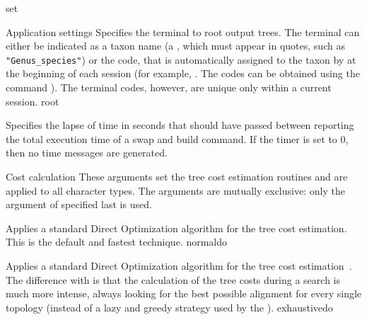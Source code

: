\begin{command}{set}{}
\begin{arguments}
\begin{argumentgroup}{Application settings}
                {Specifies the terminal to root output trees.
                 The terminal can either be indicated as a taxon name (a
                \poystring, which must appear in quotes, such as
                \texttt{"Genus\_species"}) or the code, that is automatically
                assigned to the taxon by \poy at the beginning of each \poy
                session (for example, . The codes can
                be obtained using the command ).  The
                terminal codes, however, are unique only within a current
                session.}
                {root}

                {Specifies the lapse of time in seconds that should have passed
                between reporting the total execution time of a swap and build
                command. If the timer is set to 0, then no time messages are
                generated.}{}

        \end{argumentgroup}

        \begin{argumentgroup}{Cost calculation}
            {These arguments set the tree cost estimation routines and
             are applied to all character types. The arguments
            are mutually exclusive: only the argument of 
             specified last is used.}

                {Applies a standard Direct Optimization algorithm for the tree
                cost estimation. This is the default and fastest technique.}
                {normaldo}

                {Applies a standard Direct Optimization algorithm for the tree
                cost estimation~\cite{wheeler1996,wheeler2002a}. The difference with  is
                that the calculation of the tree costs during a search is much
                more intense, always looking for the best possible alignment 
                for every single topology (instead of a lazy and greedy strategy
                used by the ).}
                {exhaustivedo}


\end{argumentgroup}
\end{arguments}
\end{command}
